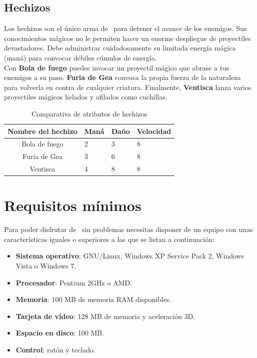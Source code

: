 \documentclass[a4paper,11pt]{article}
\begin{document}
\subsection{Hechizos}

Los hechizos son el único arma de \prota\ para detener el avance de los
enemigos. Sus conocimientos mágicos no le permiten hacer un enorme despliegue
de proyectiles devastadores. Debe administrar cuidadosamente su limitada
energía mágica (maná) para convocar débiles cúmulos de energía.\\

Con \textbf{Bola de fuego} puedes invocar un proyectil mágico que abrase
a tus enemigos a su paso. \textbf{Furia de Gea} convoca la propia fuerza
de la naturaleza para volverla en contra de cualquier criatura. Finalmente,
\textbf{Ventisca} lanza varios proyectiles mágicos helados y afilados como
cuchillas.\\

\begin{table}[H]
  \label{caracteristicas-hechizos}
  \begin{center}
  \begin{tabular}{| c ||m{2cm}|m{2cm}|m{2cm}|}
    \hline
    Nombre del hechizo & Maná & Daño & Velocidad \\
    \hline
    Bola de fuego & 2 & 3 & 8 \\
    \hline
    Furia de Gea & 3 & 6 & 8 \\
    \hline 
    Ventisca & 4 & 8 & 8 \\
    \hline
  \end{tabular}
\end{center}
\caption{Comparativa de atributos de hechizos}
\end{table}


\section{Requisitos mínimos}

Para poder disfrutar de \juego\ sin problemas necesitas disponer de un equipo
con unas características iguales o superiores a las que se listan a
continuación:

\begin{itemize}
    \itemsep0em
    \item \textbf{Sistema operativo}: GNU/Linux, Windows XP Service Pack
    2, Windows Vista o Windows 7.
    \item \textbf{Procesador}: Pentium 2GHz o AMD.
    \item \textbf{Memoria}: 100 MB de memoria RAM disponibles.
    \item \textbf{Tarjeta de vídeo}: 128 MB de memoria y aceleración 3D.
    \item \textbf{Espacio en disco}: 100 MB.
    \item \textbf{Control}: ratón y teclado.
\end{itemize}
\end{document}
